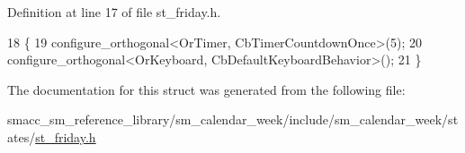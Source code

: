 Definition at line 17 of file st\+\_\+friday.\+h.


\begin{DoxyCode}
18     \{
19         configure\_orthogonal<OrTimer,  CbTimerCountdownOnce>(5);    
20         configure\_orthogonal<OrKeyboard, CbDefaultKeyboardBehavior>();
21     \}
\end{DoxyCode}


The documentation for this struct was generated from the following file\+:\begin{DoxyCompactItemize}
\item 
smacc\+\_\+sm\+\_\+reference\+\_\+library/sm\+\_\+calendar\+\_\+week/include/sm\+\_\+calendar\+\_\+week/states/\hyperlink{sm__calendar__week_2include_2sm__calendar__week_2states_2st__friday_8h}{st\+\_\+friday.\+h}\end{DoxyCompactItemize}
